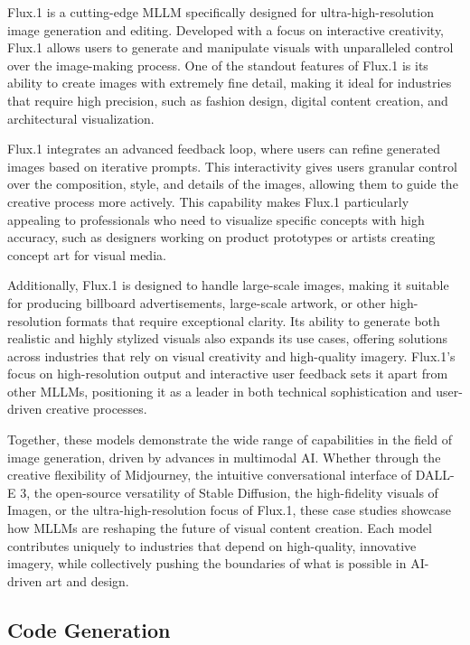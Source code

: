 Flux.1 is a cutting-edge MLLM specifically designed for ultra-high-resolution image generation and editing. Developed with a focus on interactive creativity, Flux.1 allows users to generate and manipulate visuals with unparalleled control over the image-making process. One of the standout features of Flux.1 is its ability to create images with extremely fine detail, making it ideal for industries that require high precision, such as fashion design, digital content creation, and architectural visualization.

Flux.1 integrates an advanced feedback loop, where users can refine generated images based on iterative prompts. This interactivity gives users granular control over the composition, style, and details of the images, allowing them to guide the creative process more actively. This capability makes Flux.1 particularly appealing to professionals who need to visualize specific concepts with high accuracy, such as designers working on product prototypes or artists creating concept art for visual media.

Additionally, Flux.1 is designed to handle large-scale images, making it suitable for producing billboard advertisements, large-scale artwork, or other high-resolution formats that require exceptional clarity. Its ability to generate both realistic and highly stylized visuals also expands its use cases, offering solutions across industries that rely on visual creativity and high-quality imagery. Flux.1's focus on high-resolution output and interactive user feedback sets it apart from other MLLMs, positioning it as a leader in both technical sophistication and user-driven creative processes.

Together, these models demonstrate the wide range of capabilities in the field of image generation, driven by advances in multimodal AI. Whether through the creative flexibility of Midjourney, the intuitive conversational interface of DALL-E 3, the open-source versatility of Stable Diffusion, the high-fidelity visuals of Imagen, or the ultra-high-resolution focus of Flux.1, these case studies showcase how MLLMs are reshaping the future of visual content creation. Each model contributes uniquely to industries that depend on high-quality, innovative imagery, while collectively pushing the boundaries of what is possible in AI-driven art and design.

\subsection{Code Generation}

